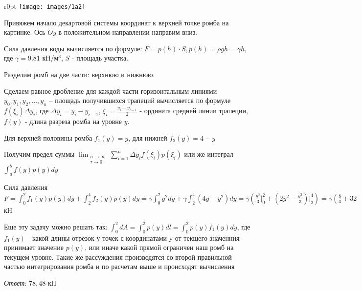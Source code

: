 \begin{minipage}{\linewidth}

    \begin{wrapfigure}{r}{0pt}
        \texttt{[image: images/1a2]}
    \end{wrapfigure}

    Привяжем начало декартовой системы координат к верхней точке ромба на картинке. Ось $Oy$ в положительном направлении направим вниз.

    Сила давления воды вычисляется по формуле: $F = p(h) \cdot S, p(h) = \rho g h = \gamma h$, где $\gamma = $9.81 кН/м$^3$, $S$ - площадь участка.

    Разделим ромб на две части: верхнюю и нижнюю.

    Сделаем равное дробление для каждой части горизонтальным линиями $y_0, y_1, y_2, \dots, y_n$ -- площадь получившихся трапеций вычисляется по формуле $f(\xi_i) \Delta y_i$,
    где $\Delta y_i = y_i - y_{i - 1}$, $\displaystyle \xi_i = \frac{y_i + y_{i - 1}}{2}$ - ордината средней линии трапеции, $f(y)$ - длина разреза ромба на уровне $y$.

    Для верхней половины ромба $f_1(y) = y$, для нижней $f_2(y) = 4 - y$

    Получим предел суммы $\displaystyle \lim_{\substack{n \to \infty \\ \tau \to 0}} \sum_{i = 1}^{n} \Delta y_i f(\xi_i) p(\xi_i)$ или же интеграл
    $\displaystyle \int_a^b f(y) p(y) dy$

    Сила давления $\displaystyle F = \int_0^2 f_1(y) p(y) dy + \int_2^4 f_2(y) p(y) dy = \gamma \int_0^2 y^2 dy + \gamma \int_2^4 (4y - y^2) dy =
    \gamma (\frac{y^3}{3} \Big|_0^2 + (2y^2 - \frac{y^3}{3}) \Big|_2^4) = \gamma (\frac{8}{3} + 32 - \frac{64}{3} - 8 + \frac{8}{3}) = 8 \gamma = 78,48$ кН

    Еще эту задачу можно решать так: $\displaystyle \int_0^2dA = \int_0^2p(y)dl = \int_0^2p(y)f_1(y)dy$, где $f_1(y)$ - какой длины отрезок у точек
    с координатами y от текшего значенния принимает значение $p(y)$, или иначе какой прямой ограничен наш ромб на текущем уровне.  
    Такие же рассуждения производятся со второй правильной частью интегрирования ромба и по расчетам выше и происходят вычисления

\end{minipage}

\vspace{14mm}

\textit{Ответ}: $78,48$ кН
\clearpage
